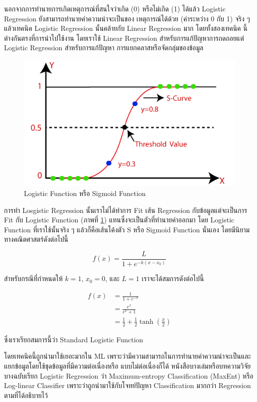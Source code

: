 นอกจากการทำนายการเกิดเหตุการณ์ที่สนใจว่าเกิด (0) หรือไม่เกิด (1) ได้แล้ว Logistic Regression ยังสามารถทำนายค่าความน่าจะเป็นของ%
เหตุการณ์ได้ด้วย (ค่าระหว่าง 0 กับ 1) จริง ๆ แล้วเทคนิค Logistic Regression นั้นคล้ายกับ Linear Regression มาก โดยทั้งสองเทคนิค%
นี้ต่างกันตรงที่การนำไปใช้งาน โดยเราใช้ Linear Regression สำหรับการแก้ปัญหาการถดถอยแต่ Logistic Regression สำหรับการแก้ปัญหา%
การแยกคลาสหรือจัดกลุ่มของข้อมูล

\begin{figure}[htbp]
    \centering
    \includegraphics[width=0.8\linewidth]{fig/s_curve_logistic_func.png}
    \caption{Logistic Function หรือ Sigmoid Function}
    \label{fig:s_curve_logistic}
\end{figure}

การทำ Losgistic Regression นั้นเราไม่ได้ทำการ Fit เส้น Regression กับข้อมูลแต่จะเป็นการ Fit กับ Logistic Function (ภาพที่ 
\ref{fig:s_curve_logistic}) แทนซึ่งจะเป็นตัวที่ทำนายค่าออกมา โดย Logistic Function ที่เราใช้นั้นจริง ๆ แล้วก็คือเส้นโค้งตัว S หรือ
Sigmoid Function นั่นเอง โดยมีนิยามทางคณิตศาสตร์ดังต่อไปนี้

\begin{equation}\label{eq:logistic_func}
    f(x) = \frac{L}{1 + e^{-k(x-x_0)}}
\end{equation}

\noindent สำหรับกรณีที่กำหนดให้ $k = 1$, $x_{0} = 0$, และ $L = 1$ เราจะได้สมการดังต่อไปนี้

\begin{align}
    f(x) &= \frac{1}{1 + e^{-x}} \nonumber \\
    &= \frac{e^x}{e^x + 1} \nonumber \\
    &= \frac12 + \frac12 \tanh\left(\frac{x}{2}\right)
\end{align}

\noindent ซึ่งเราเรียกสมการนี้ว่า Standard Logistic Function

โดยเทคนิคนี้ถูกนำมาใช้เยอะมากใน ML เพราะว่ามีความสามารถในการทำนายค่าความน่าจะเป็นและแยกข้อมูลโดยใช้ชุดข้อมูลที่มีความต่อเนื่องหรือ%
แบบไม่ต่อเนื่องก็ได้ หนังสือบางเล่มหรือบทความวิจัยบางฉบับเรียก Logistic Regression ว่า Maximum-entropy Classification (MaxEnt) 
หรือ Log-linear Classifier เพราะว่าถูกนำมาใช้กับโจทย์ปัญหา Classification มากกว่า Regression ตามที่ได้อธิบายไว้

